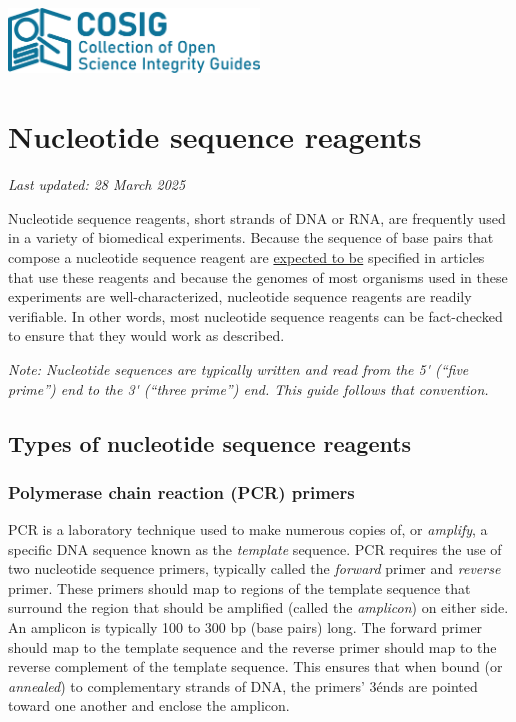 \documentclass[letterpaper, 12pt]{article}
\begin{document}
\flushleft
\includegraphics[width=0.5\textwidth]{img/home/241017_final_logo_mockup.png}

\section*{Nucleotide sequence reagents}
\textit{Last updated: 28 March 2025}

Nucleotide sequence reagents, short strands of DNA or RNA, are frequently used in a variety of biomedical experiments. Because the sequence of base pairs that compose a nucleotide sequence reagent are \href{https://doi.org/10.1373/clinchem.2008.112797}{expected to be} specified in articles that use these reagents and because the genomes of most organisms used in these experiments are well-characterized, nucleotide sequence reagents are readily verifiable. In other words, most nucleotide sequence reagents can be fact-checked to ensure that they would work as described.

\textit{Note: Nucleotide sequences are typically written and read from the 5\'{} (``five prime'') end to the 3\'{} (``three prime'') end. This guide follows that convention.}

\subsection*{Types of nucleotide sequence reagents}

\subsubsection*{Polymerase chain reaction (PCR) primers}

PCR is a laboratory technique used to make numerous copies of, or \emph{amplify}, a specific DNA sequence known as the \emph{template} sequence. PCR requires the use of two nucleotide sequence primers, typically called the \emph{forward} primer and \emph{reverse} primer. These primers should map to regions of the template sequence that surround the region that should be amplified (called the \emph{amplicon}) on either side. An amplicon is typically 100 to 300 bp (base pairs) long. The forward primer should map to the template sequence and the reverse primer should map to the reverse complement of the template sequence. This ensures that when bound (or \emph{annealed}) to complementary strands of DNA, the primers' 3\' ends are pointed toward one another and enclose the amplicon.
\end{document}
